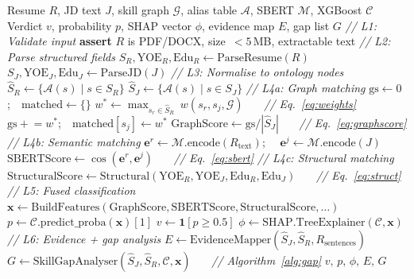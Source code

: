 \documentclass[conference]{IEEEtran}
\begin{document}
\begin{algorithm}[htbp]
\caption{ExplainHire Neurosymbolic Matching}
\label{alg:main}
\begin{algorithmic}[1]
\REQUIRE Resume $R$, JD text $J$, skill graph $\mathcal{G}$,
         alias table $\mathcal{A}$, SBERT $\mathcal{M}$,
         XGBoost $\mathcal{C}$
\ENSURE Verdict $v$, probability $p$, SHAP vector $\phi$,
        evidence map $E$, gap list $G$
\medskip
\STATE \textit{// L1: Validate input}
\STATE \textbf{assert} $R$ is PDF/DOCX, size~$< 5$\,MB, extractable text
\medskip
\STATE \textit{// L2: Parse structured fields}
\STATE $S_R, \text{YOE}_R, \text{Edu}_R \leftarrow \text{ParseResume}(R)$
\STATE $S_J, \text{YOE}_J, \text{Edu}_J \leftarrow \text{ParseJD}(J)$
\medskip
\STATE \textit{// L3: Normalise to ontology nodes}
\STATE $\hat{S}_R \leftarrow \{\mathcal{A}(s) \mid s \in S_R\}$
\STATE $\hat{S}_J \leftarrow \{\mathcal{A}(s) \mid s \in S_J\}$
\medskip
\STATE \textit{// L4a: Graph matching}
\STATE $\text{gs} \leftarrow 0$;~~$\text{matched} \leftarrow \{\}$
  \STATE $w^* \leftarrow \max_{s_r \in \hat{S}_R}~ w(s_r, s_j, \mathcal{G})$
         ~~~\textit{// Eq.~\ref{eq:weights}}
  \STATE $\text{gs} \mathrel{+}= w^*$;~~$\text{matched}[s_j] \leftarrow w^*$
\ENDFOR
\STATE $\text{GraphScore} \leftarrow \text{gs} / |\hat{S}_J|$
       ~~~\textit{// Eq.~\ref{eq:graphscore}}
\medskip
\STATE \textit{// L4b: Semantic matching}
\STATE $\mathbf{e}^r \leftarrow \mathcal{M}.\text{encode}(R_{\text{text}})$;~~
       $\mathbf{e}^j \leftarrow \mathcal{M}.\text{encode}(J)$
\STATE $\text{SBERTScore} \leftarrow \cos(\mathbf{e}^r, \mathbf{e}^j)$
       ~~~\textit{// Eq.~\ref{eq:sbert}}
\medskip
\STATE \textit{// L4c: Structural matching}
\STATE $\text{StructuralScore} \leftarrow
       \text{Structural}(\text{YOE}_R, \text{YOE}_J, \text{Edu}_R, \text{Edu}_J)$
       ~~~\textit{// Eq.~\ref{eq:struct}}
\medskip
\STATE \textit{// L5: Fused classification}
\STATE $\mathbf{x} \leftarrow \text{BuildFeatures}(\text{GraphScore},
       \text{SBERTScore}, \text{StructuralScore}, \ldots)$
\STATE $p \leftarrow \mathcal{C}.\text{predict\_proba}(\mathbf{x})[1]$
\STATE $v \leftarrow \mathbf{1}[p \geq 0.5]$
\STATE $\phi \leftarrow \text{SHAP.TreeExplainer}(\mathcal{C}, \mathbf{x})$
\medskip
\STATE \textit{// L6: Evidence + gap analysis}
\STATE $E \leftarrow \text{EvidenceMapper}(\hat{S}_J, \hat{S}_R, R_\text{sentences})$
\STATE $G \leftarrow \text{SkillGapAnalyser}(\hat{S}_J, \hat{S}_R, \mathcal{C}, \mathbf{x})$
       ~~~\textit{// Algorithm~\ref{alg:gap}}
\RETURN $v,\, p,\, \phi,\, E,\, G$
\end{algorithmic}
\end{algorithm}
\end{document}
